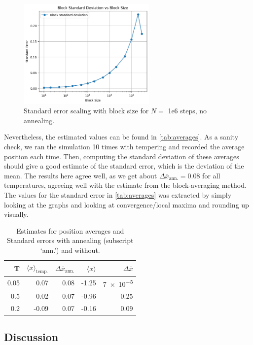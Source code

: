 \documentclass[11pt]{article}
\newcommand{\sub}[1]{_{\text{#1}}}
\begin{document}
\begin{figure}
	\centering
	\includegraphics[width = 0.6\textwidth]{block_average.png}
	\caption{Standard error scaling with block size for $N =$ 1e6 steps, no annealing.}
	\label{fig:converge}
\end{figure}

Nevertheless, the estimated values can be found in \autoref{tab:averages}.
As a sanity check, we ran the simulation 10 times with tempering and recorded the average position each time. Then, computing the standard deviation of these averages should give a good estimate of the standard error, which is the deviation of the mean.
The results here agree well, as we get about $\Delta\bar x\sub{ann.} = 0.08$ for all temperatures, agreeing well with the estimate from the block-averaging method.
The values for the standard error in \autoref{tab:averages} was extracted by simply looking at the graphs and looking at convergence/local maxima and rounding up visually.


\begin{table}
	\centering
		\caption{Estimates for position averages and Standard errors with annealing (subscript `ann.') and without.}
	\label{tab:averages}
	\begin{tabular}{r r r r r}\hline
		T & $\langle x \rangle\sub{temp.}$ & $\Delta \bar x\sub{ann.}$ & $\langle x \rangle$ & $\Delta \bar x$\\\hline
		0.05 & 0.07 & 0.08 & -1.25 & \num{7e-5}\\
		0.5 & 0.02 & 0.07 & -0.96 & 0.25\\
		0.2 & -0.09 & 0.07 & -0.16 & 0.09\\\hline\hline
	\end{tabular}

\end{table}


\subsection{Discussion}
\end{document}

